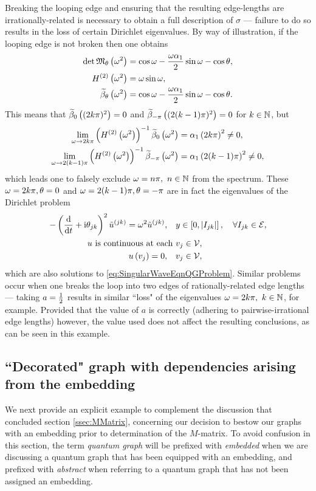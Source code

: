 Breaking the looping edge and ensuring that the resulting edge-lengths are irrationally-related is necessary to obtain a full description of $\sigma$ --- failure to do so results in the loss of certain Dirichlet eigenvalues.
By way of illustration, if the looping edge is not broken then one obtains
\begin{align*}
	\det\mathfrak{M}_{\theta}\left( \omega^2 \right) &= \cos\omega - \frac{\omega\alpha_1}{2}\sin\omega - \cos\theta, \\
	H^{(2)}\left( \omega^2 \right) &= \omega\sin\omega, \\
	\widetilde{\beta}_{\theta}\left( \omega^2 \right) &= \cos\omega - \frac{\omega\alpha_1}{2}\sin\omega - \cos\theta.
\end{align*}
This means that $\widetilde{\beta}_{0}\left( (2k\pi)^2 \right)=0$ and $\widetilde{\beta}_{-\pi}\left( (2(k-1)\pi)^2 \right)=0$ for $k\in\mathbb{N}$, but 
\begin{align*}
	\lim_{\omega\rightarrow 2k\pi}\left(  H^{(2)}\left( \omega^2 \right)  \right)^{-1}\widetilde{\beta}_{0}\left( \omega^2 \right) &= \alpha_1\left( 2k\pi \right)^2 \neq 0, \\
	\lim_{\omega\rightarrow 2(k-1)\pi}\left(  H^{(2)}\left( \omega^2 \right)  \right)^{-1}\widetilde{\beta}_{-\pi}\left( \omega^2 \right) &= \alpha_1\left( 2(k-1)\pi \right)^2 \neq 0,
\end{align*}
which leads one to falsely exclude $\omega=n\pi, \ n\in\mathbb{N}$ from the spectrum.
These $\omega=2k\pi, \theta=0$ and $\omega=2(k-1)\pi, \theta=-\pi$ are in fact the eigenvalues of the Dirichlet problem
\begin{align*}
	-\left( \dfrac{\mathrm{d}}{\mathrm{d}t} + \mathrm{i}\theta_{jk} \right)^2 \tilde{u}^{(jk)} = \omega^2 \tilde{u}^{(jk)}, \quad & y\in\left[ 0,\left\lvert I_{jk} \right\rvert \right], \quad \forall I_{jk}\in \mathcal{E}, \\
	u \text{ is continuous at each } &v_j \in \mathcal{V}, \\
	u\left( v_j \right) = 0, \quad &v_j\in\mathcal{V},
\end{align*}
which are also solutions to \eqref{eq:SingularWaveEqnQGProblem}.
Similar problems occur when one breaks the loop into two edges of rationally-related edge lengths --- taking $a=\frac{1}{2}$ results in similar ``loss" of the eigenvalues $\omega=2k\pi, \ k\in\naturals$, for example.
Provided that the value of $a$ is correctly (adhering to pairwise-irrational edge lengths) however, the value used does not affect the resulting conclusions, as can be seen in this example.

\subsection{``Decorated" graph with dependencies arising from the embedding} \label{ssec:EmbeddingDependentExample}
We next provide an explicit example to complement the discussion that concluded section \ref{ssec:MMatrix}, concerning our decision to bestow our graphs with an embedding prior to determination of the $M$-matrix. 
To avoid confusion in this section, the term \emph{quantum graph} will be prefixed with \emph{embedded} when we are discussing a quantum graph that has been equipped with an embedding, and prefixed with \emph{abstract} when referring to a quantum graph that has not been assigned an embedding.

